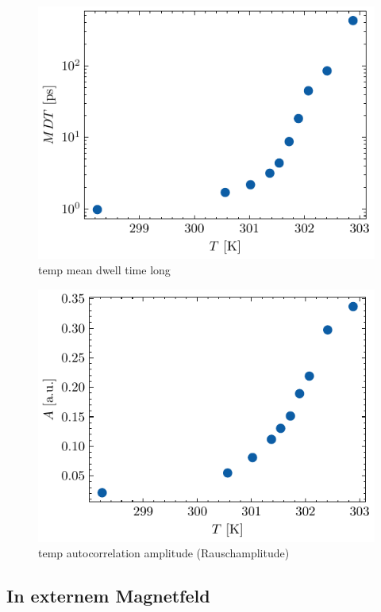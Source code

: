 \documentclass[main.tex]{subfiles}
\begin{document}
\begin{figure}[H]
    \centering
    \includegraphics{bilder/plots/temp_comparison_long/mean_dwell_time.pdf}
    \caption{temp mean dwell time long}\label{fig:temp-mdt-long}
\end{figure}


\begin{figure}[H]
    \centering
    \includegraphics{bilder/plots/temp_comparison_long/rauschamplitude.pdf}
    \caption{temp autocorrelation amplitude (Rauschamplitude)}\label{fig:temp-autocorr-amplitude}
\end{figure}

\subsection{In externem Magnetfeld}
\end{document}
